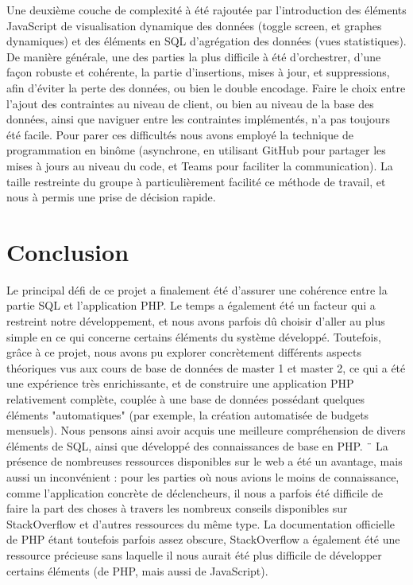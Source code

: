 \documentclass[a4paper,12pt]{article}
\begin{document}
Une deuxième couche de complexité à été rajoutée par l'introduction des éléments JavaScript de visualisation dynamique des données (toggle screen, et graphes dynamiques) et des éléments en SQL d'agrégation des données (vues statistiques).
De manière générale, une des parties la plus difficile à été d'orchestrer, d'une façon robuste et cohérente, la partie d'insertions, mises à jour, et suppressions, afin d'éviter la perte des données, ou bien le double encodage.
Faire le choix entre l'ajout des contraintes au niveau de client, ou bien au niveau de la base des données, ainsi que naviguer entre les contraintes implémentés, n'a pas toujours été facile.
Pour parer ces difficultés nous avons employé la technique de programmation en binôme (asynchrone, en utilisant GitHub pour partager les mises à jours au niveau du code, et Teams pour faciliter la communication).
La taille restreinte du groupe à particulièrement facilité ce méthode de travail, et nous à permis une prise de décision rapide.

\newpage
\section{Conclusion}

Le principal défi de ce projet a finalement été d'assurer une cohérence entre la partie SQL et l'application PHP.
Le temps a également été un facteur qui a restreint notre développement, et nous avons parfois dû choisir d'aller au plus simple en ce qui concerne certains éléments du système développé.
Toutefois, grâce à ce projet, nous avons pu explorer concrètement différents aspects théoriques vus aux cours de base de données de master 1 et master 2, ce qui a été une expérience très enrichissante, et de construire une application PHP relativement complète, couplée à une base de données possédant quelques éléments "automatiques" (par exemple, la création automatisée de budgets mensuels). Nous pensons ainsi avoir acquis une meilleure compréhension de divers éléments de SQL, ainsi que développé des connaissances de base en PHP.
¨
La présence de nombreuses ressources disponibles sur le web a été un avantage, mais aussi un inconvénient : pour les parties où nous avions le moins de connaissance, comme l'application concrète de déclencheurs, il nous a parfois été difficile de faire la part des choses à travers les nombreux conseils disponibles sur StackOverflow et d'autres ressources du même type.
La documentation officielle de PHP étant toutefois parfois assez obscure, StackOverflow a également été une ressource précieuse sans laquelle il nous aurait été plus difficile de développer certains éléments (de PHP, mais aussi de JavaScript).
\end{document}
